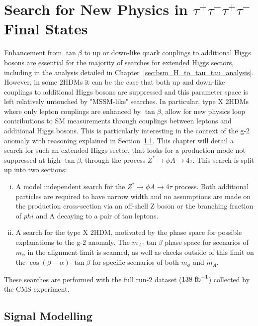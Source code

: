 \chapter{\texorpdfstring{Search for New Physics in $\tau^+\tau^-\tau^+\tau^-$ Final States}{Search for new physics in tautautautau final states}}
\label{sec:H_A_to_4_tau_analysis}

Enhancement from $\tan\beta$ to up or down-like quark couplings to additional Higgs bosons are essential for the majority of searches for extended Higgs sectors, including in the analysis detailed in Chapter~\ref{sec:bsm_H_to_tau_tau_analysis}.
However, in some 2HDMs it can be the case that both up and down-like couplings to additional Higgs bosons are suppressed and this parameter space is left relatively untouched by "MSSM-like" searches.
In particular, type X 2HDMs where only lepton couplings are enhanced by $\tan\beta$, allow for new physics loop contributions to SM measurements through couplings between leptons and additional Higgs bosons.
This is particularly interesting in the context of the g-2 anomaly \cite{} with reasoning explained in Section~\ref{}.
This chapter will detail a search for such an extended Higgs sector, that looks for a production mode not suppressed at high $\tan\beta$, through the process $Z^{*}\rightarrow \phi A \rightarrow 4\tau$.
This search is split up into two sections:

\begin{enumerate}[i)]
  \item A model independent search for the $Z^{*}\rightarrow \phi A \rightarrow 4\tau$ process. Both additional particles are required to have narrow width and no assumptions are made on the production cross-section via an off-shell Z boson or the branching fraction of $phi$ and A decaying to a pair of tau leptons.
   \item A search for the type X 2HDM, motivated by the phase space for possible explanations to the g-2 anomaly. The $m_{A}$-$\tan\beta$ phase space for scenarios of $m_\phi$ in the alignment limit is scanned, as well as checks outside of this limit on the $\cos(\beta-\alpha)$-$\tan\beta$ for specific scenarios of both $m_\phi$ and $m_A$.
\end{enumerate}

These searches are performed with the full run-2 dataset ($138 \text{ fb}^{-1}$) collected by the CMS experiment. 

\section{Signal Modelling}

